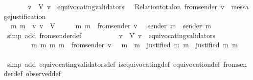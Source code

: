 \begin{isabellebody}
\ \ {\isachardoublequoteopen}{\isasymforall}\ {\isasymsigma}\ {\isasymin}\ {\isasymSigma}{\isachardot}\ {\isacharparenleft}{\isasymforall}\ v\ {\isasymin}\ V{\isachardot}\ v\ {\isasymnotin}\ equivocating{\isacharunderscore}validators\ {\isasymsigma}\ {\isasymlongrightarrow}\ Relation{\isachardot}total{\isacharunderscore}on\ {\isacharparenleft}from{\isacharunderscore}sender\ {\isacharparenleft}v{\isacharcomma}\ {\isasymsigma}{\isacharparenright}{\isacharparenright}\ message{\isacharunderscore}justification{\isacharparenright}{\isachardoublequoteclose}\isanewline
%
\isadelimproof
%
\endisadelimproof
%
\isatagproof
{}\isamarkupfalse%
\ {\isacharminus}\isanewline
\ \ \isamarkupfalse%
\ {\isachardoublequoteopen}{\isasymforall}\ m{}\ m{}\ {\isasymsigma}\ v{\isachardot}\ v\ {\isasymin}\ V\ {\isasymand}\ {\isasymsigma}\ {\isasymin}\ {\isasymSigma}\ {\isasymand}\ {\isacharbraceleft}m{}{\isacharcomma}\ m{}{\isacharbraceright}\ {\isasymsubseteq}\ from{\isacharunderscore}sender\ {\isacharparenleft}v{\isacharcomma}\ {\isasymsigma}{\isacharparenright}\ {\isasymlongrightarrow}\ sender\ m{}\ {\isacharequal}\ sender\ m{}\ {\isachardoublequoteclose}\isanewline
\ \ \ \ \isamarkupfalse%
\ {\isacharparenleft}simp\ add{\isacharcolon}\ from{\isacharunderscore}sender{\isacharunderscore}def{\isacharparenright}\isanewline
\ \ \isamarkupfalse%
\ \isamarkupfalse%
\ {\isachardoublequoteopen}{\isasymforall}\ {\isasymsigma}\ {\isasymin}\ {\isasymSigma}{\isachardot}\ {\isacharparenleft}{\isasymforall}\ v\ {\isasymin}\ V{\isachardot}\ v\ {\isasymnotin}\ equivocating{\isacharunderscore}validators\ {\isasymsigma}\ \isanewline
\ \ \ \ \ \ {\isasymlongrightarrow}\ {\isacharparenleft}{\isasymforall}\ m{}\ m{}{\isachardot}\ {\isacharbraceleft}m{}{\isacharcomma}\ m{}{\isacharbraceright}\ {\isasymsubseteq}\ from{\isacharunderscore}sender\ {\isacharparenleft}v{\isacharcomma}\ {\isasymsigma}{\isacharparenright}\ {\isasymlongrightarrow}\ m{}\ {\isacharequal}\ m{}\ {\isasymor}\ justified\ m{}\ m{}\ {\isasymor}\ justified\ m{}\ m{}{\isacharparenright}{\isacharparenright}{\isachardoublequoteclose}\ \isanewline
\ \ \ \ \isamarkupfalse%
\ {\isacharparenleft}simp\ add{\isacharcolon}\ equivocating{\isacharunderscore}validators{\isacharunderscore}def\ is{\isacharunderscore}equivocating{\isacharunderscore}def\ equivocation{\isacharunderscore}def\ from{\isacharunderscore}sender{\isacharunderscore}def\ observed{\isacharunderscore}def{\isacharparenright}\isanewline

\end{isabellebody}
